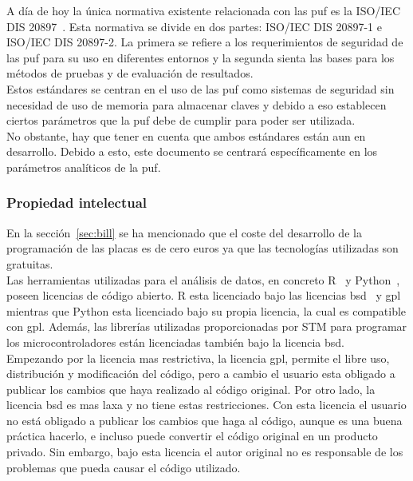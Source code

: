 \documentclass[spanish]{template/minim}
\begin{document}
A día de hoy la única normativa existente relacionada con las \gls{puf} es la ISO/IEC DIS 20897~\cite{ISO20897}. Esta normativa se divide en dos partes: ISO/IEC DIS 20897-1 e ISO/IEC DIS 20897-2. La primera se refiere a los requerimientos de seguridad de las \gls{puf} para su uso en diferentes entornos y la segunda sienta las bases para los métodos de pruebas y de evaluación de resultados.\\

Estos estándares se centran en el uso de las \gls{puf} como sistemas de seguridad sin necesidad de uso de memoria para almacenar claves y debido a eso establecen ciertos parámetros que la \gls{puf} debe de cumplir para poder ser utilizada.\\

No obstante, hay que tener en cuenta que ambos estándares están aun en desarrollo. Debido a esto, este documento se centrará específicamente en los parámetros analíticos de la \gls{puf}.\\


\subsubsection{Propiedad intelectual}

En la sección~\ref{sec:bill} se ha mencionado que el coste del desarrollo de la programación de las placas es de cero euros ya que las tecnologías utilizadas son gratuitas.\\

Las herramientas utilizadas para el análisis de datos, en concreto R~\cite{r} y Python~\cite{python}, poseen licencias de código abierto. R esta licenciado bajo las licencias \gls{bsd}~\cite{bsd} y \gls{gpl}~\cite{gpl} mientras que Python esta licenciado bajo su propia licencia, la cual es compatible con \gls{gpl}. Además, las librerías utilizadas proporcionadas por STM para programar los microcontroladores están licenciadas también bajo la licencia \gls{bsd}.\\

Empezando por la licencia mas restrictiva, la licencia \gls{gpl}, permite el libre uso, distribución y modificación del código, pero a cambio el usuario esta obligado a publicar los cambios que haya realizado al código original. Por otro lado, la licencia \gls{bsd} es mas laxa y no tiene estas restricciones. Con esta licencia el usuario no está obligado a publicar los cambios que haga al código, aunque es una buena práctica hacerlo, e incluso puede convertir el código original en un producto privado. Sin embargo, bajo esta licencia el autor original no es responsable de los problemas que pueda causar el código utilizado.\\
\end{document}
